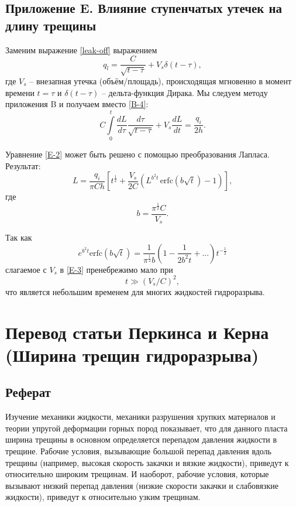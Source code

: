 \documentclass[a4paper, 12pt]{article}
\newcommand{\beq}{\begin{equation}}
\newcommand{\eeq}{\end{equation}}
\begin{document}
\subsection{Приложение E. Влияние ступенчатых утечек на длину трещины}

Заменим выражение \eqref{leak-off} выражением
\beq\label{E-1}
q_l=\frac{C}{\sqrt{t-\tau}}+V_s\delta(t-\tau),
\tag{E-1}
\eeq
где $V_s$ -- внезапная утечка (объём/площадь), происходящая мгновенно в момент времени $t=\tau$ и $\delta(t-\tau)$ -- дельта-функция Дирака.
Мы следуем методу приложения B и получаем вместо \eqref{B-4}:
\beq\label{E-2}
C\int\limits_{0}^{t}{\frac{dL}{d\tau}}\frac{d\tau}{\sqrt{t-\tau}}+V_s\frac{dL}{dt}=\frac{q_i}{2h}.
\tag{E-2}
\eeq

Уравнение \eqref{E-2} может быть решено с помощью преобразования Лапласа.
Результат:
\beq\label{E-3}
L=\frac{q_i}{\pi Ch}\left[t^{\frac{1}{2}}+\frac{V_s}{2C}\left(L^{b^2t}\,\textrm{erfc}\!\left(b\sqrt{t}\right)-1\right)\right],
\tag{E-3}
\eeq
где
$$
b=\frac{\pi^{\frac{1}{2}}C}{V_s}.
$$

Так как
\beq\label{E-4}
e^{b^2t}\textrm{erfc}\!\left(b\sqrt{t}\right)=\frac{1}{\pi^{\frac{1}{2}}b}\left(1-\frac{1}{2b^2t}+...\right)t^{-\frac{1}{2}}
\tag{E-4}
\eeq
слагаемое с $V_s$ в \eqref{E-3} пренебрежимо мало при
\beq\label{E-5}
t\gg(V_s/C)^2,
\tag{E-5}
\eeq
что является небольшим временем для многих жидкостей гидроразрыва.

\newpage

\section{Перевод статьи Перкинса и Керна (Ширина трещин гидроразрыва)}

\subsection{Реферат}

Изучение механики жидкости, механики разрушения хрупких материалов и теории упругой деформации горных пород показывает, что для данного пласта ширина трещины в основном определяется перепадом давления жидкости в трещине.
Рабочие условия, вызывающие большой перепад давления вдоль трещины (например, высокая скорость закачки и вязкие жидкости), приведут к относительно широким трещинам.
И наоборот, рабочие условия, которые вызывают низкий перепад давления (низкие скорости закачки и слабовязкие жидкости), приведут к относительно узким трещинам.
\end{document}
